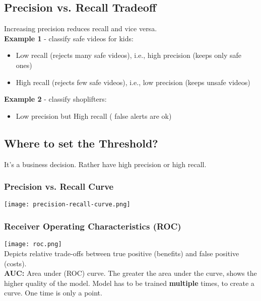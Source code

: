 \subsection{Precision vs. Recall Tradeoff}
Increasing precision reduces recall and vice versa.\\
\textbf{Example 1} - classify safe videos for kids:
\begin{itemize}
  \item Low recall (rejects many safe videos), i.e., high precision (keeps only safe ones)
  \item High recall (rejects few safe videos), i.e., low precision (keeps unsafe videos)
\end{itemize}
\textbf{Example 2} - classify shoplifters:
\begin{itemize}
  \item Low precision but High recall ( false alerts are ok)
\end{itemize}

\subsection{Where to set the Threshold?}
It's a business decision. Rather have high precision or high recall.

\subsubsection{Precision vs. Recall Curve}
\texttt{[image: precision-recall-curve.png]}

\subsubsection{Receiver Operating Characteristics (ROC)}
\texttt{[image: roc.png]}\\
Depicts relative trade-offs between true positive (benefits) and false positive (costs).\\
\textbf{AUC:} Area under (ROC) curve. 
The greater the area under the curve, shows the higher quality of the model.
Model has to be trained \textbf{multiple} times, to create a curve. One time is only a point.
